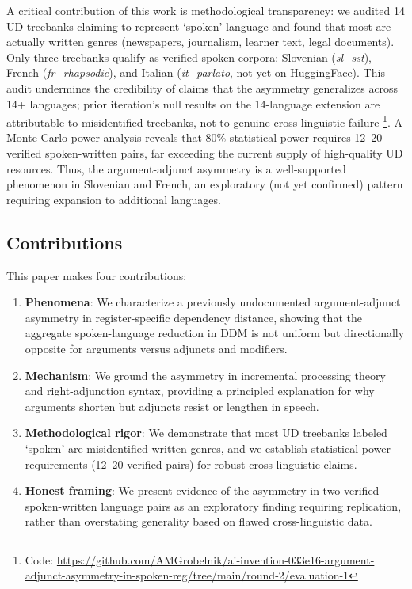 \documentclass[11pt,letterpaper]{article}
\begin{document}
A critical contribution of this work is methodological transparency: we audited 14 UD treebanks claiming to represent `spoken' language and found that most are actually written genres (newspapers, journalism, learner text, legal documents). Only three treebanks qualify as verified spoken corpora: Slovenian (\textit{sl\_sst}), French (\textit{fr\_rhapsodie}), and Italian (\textit{it\_parlato}, not yet on HuggingFace). This audit undermines the credibility of claims that the asymmetry generalizes across 14+ languages; prior iteration's null results on the 14-language extension are attributable to misidentified treebanks, not to genuine cross-linguistic failure%
\footnote{Code: \url{https://github.com/AMGrobelnik/ai-invention-033e16-argument-adjunct-asymmetry-in-spoken-reg/tree/main/round-2/evaluation-1}}.
A Monte Carlo power analysis reveals that 80\% statistical power requires 12--20 verified spoken-written pairs, far exceeding the current supply of high-quality UD resources. Thus, the argument-adjunct asymmetry is a well-supported phenomenon in Slovenian and French, an exploratory (not yet confirmed) pattern requiring expansion to additional languages.

\subsection*{Contributions}

This paper makes four contributions:

\begin{enumerate}
  \item \textbf{Phenomena}: We characterize a previously undocumented argument-adjunct asymmetry in register-specific dependency distance, showing that the aggregate spoken-language reduction in DDM is not uniform but directionally opposite for arguments versus adjuncts and modifiers.

  \item \textbf{Mechanism}: We ground the asymmetry in incremental processing theory and right-adjunction syntax, providing a principled explanation for why arguments shorten but adjuncts resist or lengthen in speech.

  \item \textbf{Methodological rigor}: We demonstrate that most UD treebanks labeled `spoken' are misidentified written genres, and we establish statistical power requirements (12--20 verified pairs) for robust cross-linguistic claims.

  \item \textbf{Honest framing}: We present evidence of the asymmetry in two verified spoken-written language pairs as an exploratory finding requiring replication, rather than overstating generality based on flawed cross-linguistic data.
\end{enumerate}
\end{document}
